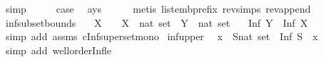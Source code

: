 \begin{isabellebody}
\ simp\isanewline
\ \ \isamarkupfalse%
\ \isamarkupfalse%
\ {\isacharquery}{\kern0pt}case\ \isamarkupfalse%
\ a{\isacharunderscore}{\kern0pt}ys\isanewline
\ \ \ \ \isamarkupfalse%
\ {\isacharparenleft}{\kern0pt}metis\ list{\isacharunderscore}{\kern0pt}emb{\isacharunderscore}{\kern0pt}prefix\ rev{\isachardot}{\kern0pt}simps{\isacharparenleft}{\kern0pt}{}{\isacharparenright}{\kern0pt}\ rev{\isacharunderscore}{\kern0pt}append{\isacharparenright}{\kern0pt}\isanewline
{}\isamarkupfalse%
%
\endisatagproof
{\isafoldproof}%
%
\isadelimproof
\isanewline
%
\endisadelimproof
\isanewline
{}\isamarkupfalse%
\ inf{\isacharunderscore}{\kern0pt}subset{\isacharunderscore}{\kern0pt}bounds{\isacharcolon}{\kern0pt}\isanewline
\ \ \ {\isachardoublequoteopen}X\ {\isasymnoteq}\ {\isacharbraceleft}{\kern0pt}{\isacharbraceright}{\kern0pt}{\isachardoublequoteclose}\ \ {\isachardoublequoteopen}{\isacharparenleft}{\kern0pt}X\ {\isacharcolon}{\kern0pt}{\isacharcolon}{\kern0pt}\ nat\ set{\isacharparenright}{\kern0pt}\ {\isasymsubseteq}\ {\isacharparenleft}{\kern0pt}Y\ {\isacharcolon}{\kern0pt}{\isacharcolon}{\kern0pt}\ nat\ set{\isacharparenright}{\kern0pt}{\isachardoublequoteclose}\isanewline
\ \ \ {\isachardoublequoteopen}Inf\ Y\ {\isasymle}\ Inf\ X{\isachardoublequoteclose}\isanewline
%
\isadelimproof
\ \ %
\endisadelimproof
%
\isatagproof
{}\isamarkupfalse%
\ {\isacharparenleft}{\kern0pt}simp\ add{\isacharcolon}{\kern0pt}\ assms{\isacharparenleft}{\kern0pt}{}{\isacharcomma}{\kern0pt}{}{\isacharparenright}{\kern0pt}\ cInf{\isacharunderscore}{\kern0pt}superset{\isacharunderscore}{\kern0pt}mono{\isacharparenright}{\kern0pt}%
\endisatagproof
{\isafoldproof}%
%
\isadelimproof
\isanewline
%
\endisadelimproof
\isanewline
{}\isamarkupfalse%
\ inf{\isacharunderscore}{\kern0pt}upper{\isacharcolon}{\kern0pt}\isanewline
\ \ {\isachardoublequoteopen}x\ {\isasymin}\ {\isacharparenleft}{\kern0pt}S{\isacharcolon}{\kern0pt}{\isacharcolon}{\kern0pt}nat\ set{\isacharparenright}{\kern0pt}\ {\isasymlongrightarrow}\ Inf\ S\ {\isasymle}\ x{\isachardoublequoteclose}\isanewline
%
\isadelimproof
\ \ %
\endisadelimproof
%
\isatagproof
{}\isamarkupfalse%
\ {\isacharparenleft}{\kern0pt}simp\ add{\isacharcolon}{\kern0pt}\ wellorder{\isacharunderscore}{\kern0pt}Inf{\isacharunderscore}{\kern0pt}le{}{\isacharparenright}{\kern0pt}%
\endisatagproof

\end{isabellebody}
